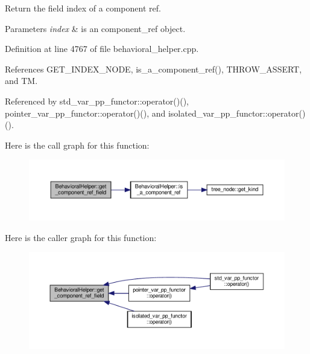 Return the field index of a component ref. 


\begin{DoxyParams}{Parameters}
{\em index} & is an component\+\_\+ref object. \\
\hline
\end{DoxyParams}


Definition at line 4767 of file behavioral\+\_\+helper.\+cpp.



References G\+E\+T\+\_\+\+I\+N\+D\+E\+X\+\_\+\+N\+O\+DE, is\+\_\+a\+\_\+component\+\_\+ref(), T\+H\+R\+O\+W\+\_\+\+A\+S\+S\+E\+RT, and TM.



Referenced by std\+\_\+var\+\_\+pp\+\_\+functor\+::operator()(), pointer\+\_\+var\+\_\+pp\+\_\+functor\+::operator()(), and isolated\+\_\+var\+\_\+pp\+\_\+functor\+::operator()().

Here is the call graph for this function\+:
\nopagebreak
\begin{figure}[H]
\begin{center}
\leavevmode
\includegraphics[width=350pt]{dd/db2/classBehavioralHelper_a434d3ef93a1ec7bb1e3d104aa6a936d4_cgraph}
\end{center}
\end{figure}
Here is the caller graph for this function\+:
\nopagebreak
\begin{figure}[H]
\begin{center}
\leavevmode
\includegraphics[width=350pt]{dd/db2/classBehavioralHelper_a434d3ef93a1ec7bb1e3d104aa6a936d4_icgraph}
\end{center}
\end{figure}
\mbox{\label{classBehavioralHelper_ab21921c77ebb4ed124d6059ad69cb523}} 
